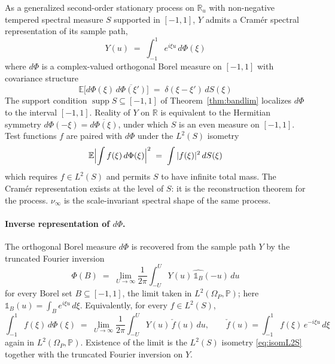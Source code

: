 \documentclass[11pt]{article}
\DeclareMathOperator{\supp}{supp}
\begin{document}
As a generalized second-order stationary process on $\mathbb{R}_u$ with non-negative tempered spectral measure $S$ supported in $[-1,1]$, $Y$ admits a Cram\'er spectral representation of its sample path,
\begin{equation}\label{eq:cramerY}
Y(u) \;=\; \int_{-1}^{1} e^{i\xi u}\,d\Phi(\xi)
\end{equation}
where $d\Phi$ is a complex-valued orthogonal Borel measure on $[-1,1]$ with covariance structure
\begin{equation}\label{eq:Phicov}
\mathbb{E}\bigl[d\Phi(\xi)\,\overline{d\Phi(\xi')}\bigr] \;=\; \delta(\xi-\xi')\,dS(\xi)
\end{equation}
The support condition $\supp S\subseteq[-1,1]$ of Theorem~\ref{thm:bandlim} localizes $d\Phi$ to the interval $[-1,1]$. Reality of $Y$ on $\mathbb{R}$ is equivalent to the Hermitian symmetry $d\Phi(-\xi)=\overline{d\Phi(\xi)}$, under which $S$ is an even measure on $[-1,1]$. Test functions $f$ are paired with $d\Phi$ under the $L^2(S)$ isometry
\begin{equation}\label{eq:isomL2S}
\mathbb{E}\Bigl|\int f(\xi)\,d\Phi(\xi)\Bigr|^2 \;=\; \int|f(\xi)|^2\,dS(\xi)
\end{equation}
which requires $f\in L^2(S)$ and permits $S$ to have infinite total mass. The Cram\'er representation exists at the level of $S$: it is the reconstruction theorem for the process. $\nu_\infty$ is the scale-invariant spectral shape of the same process.

\paragraph{Inverse representation of $d\Phi$.} The orthogonal Borel measure $d\Phi$ is recovered from the sample path $Y$ by the truncated Fourier inversion
\begin{equation}\label{eq:Phiinverse}
\Phi(B) \;=\; \lim_{U\to\infty}\frac{1}{2\pi}\int_{-U}^{U}Y(u)\,\widehat{\mathbb{1}_B}(-u)\,du
\end{equation}
for every Borel set $B\subseteq[-1,1]$, the limit taken in $L^2(\Omega_P,\mathbb{P})$; here $\widehat{\mathbb{1}_B}(u)=\int_B e^{i\xi u}\,d\xi$. Equivalently, for every $f\in L^2(S)$,
\begin{equation}\label{eq:Phiinverse-test}
\int_{-1}^{1}f(\xi)\,d\Phi(\xi) \;=\; \lim_{U\to\infty}\frac{1}{2\pi}\int_{-U}^{U}Y(u)\,\check f(u)\,du,\qquad \check f(u)=\int_{-1}^{1}f(\xi)\,e^{-i\xi u}\,d\xi
\end{equation}
again in $L^2(\Omega_P,\mathbb{P})$. Existence of the limit is the $L^2(S)$ isometry \eqref{eq:isomL2S} together with the truncated Fourier inversion on $Y$.
\end{document}

